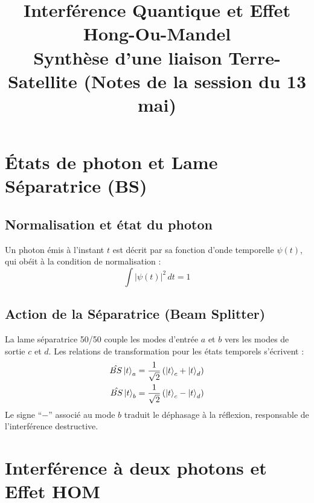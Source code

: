 \documentclass[11pt,a4paper]{article}
\title{\textbf{Interférence Quantique et Effet Hong-Ou-Mandel}\\ \large Synthèse d'une liaison Terre-Satellite (Notes de la session du 13 mai)}
\author{}
\date{}
\begin{document}
\maketitle

\section{États de photon et Lame Séparatrice (BS)}

\subsection{Normalisation et état du photon}
Un photon émis à l'instant $t$ est décrit par sa fonction d'onde temporelle $\psi(t)$,
qui obéit à la condition de normalisation :
\begin{equation}
    \int |\psi(t)|^2 \, dt = 1
\end{equation}


\subsection{Action de la Séparatrice (Beam Splitter)}
La lame séparatrice 50/50 couple les modes d'entrée $a$ et $b$ vers les modes de
sortie $c$ et $d$. Les relations de transformation pour les états temporels s'écrivent :
\begin{align}
    \hat{BS} \ket{t}_a &= \frac{1}{\sqrt{2}}\left(\ket{t}_c + \ket{t}_d\right) \\
    \hat{BS} \ket{t}_b &= \frac{1}{\sqrt{2}}\left(\ket{t}_c - \ket{t}_d\right)
\end{align}
Le signe ``$-$'' associé au mode $b$ traduit le déphasage à la réflexion,
responsable de l'interférence destructive.

\section{Interférence à deux photons et Effet HOM}
\end{document}
